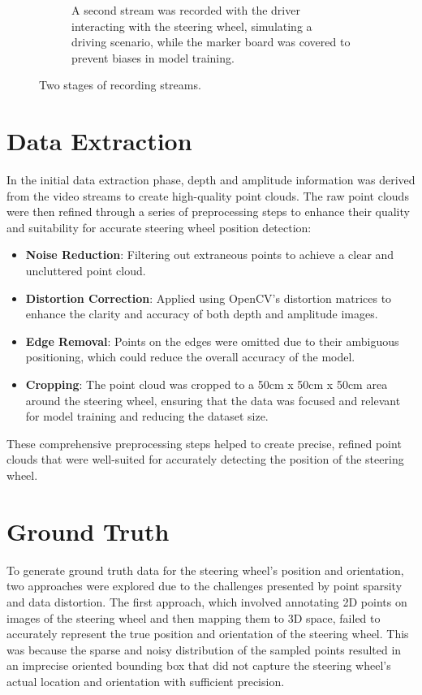 \begin{figure}[ht]
\begin{subfigure}[t]{0.45\textwidth}
        \caption{A second stream was recorded with the driver 
        interacting with the steering wheel, simulating a 
        driving scenario, while the marker board was covered 
        to prevent biases in model training.}
        \label{fig:main_stream}
    \end{subfigure}
    \caption{Two stages of recording streams.}
\end{figure}

\section{Data Extraction}
In the initial data extraction phase, depth and amplitude 
information was derived from the video streams to create 
high-quality point clouds. The raw point clouds were then refined 
through a series of preprocessing steps to enhance their quality 
and suitability for accurate steering wheel position detection:

\begin{itemize}
    \item \textbf{Noise Reduction}: Filtering out extraneous points to 
    achieve a clear and uncluttered point cloud.
    \item \textbf{Distortion Correction}: Applied using 
    OpenCV's distortion matrices to enhance the clarity and accuracy 
    of both depth and amplitude images.
    \item \textbf{Edge Removal}: Points on the edges  
    were omitted due to their ambiguous positioning, which could 
    reduce the overall accuracy of the model.
    \item \textbf{Cropping}: The point cloud was cropped to a 
    50cm x 50cm x 50cm area around the steering wheel, ensuring that 
    the data was focused and relevant for model training and reducing 
    the dataset size.
\end{itemize}

These comprehensive preprocessing steps helped to create precise, 
refined point clouds that were well-suited for accurately detecting 
the position of the steering wheel.


\section{Ground Truth}
To generate ground truth data for the steering wheel's position and 
orientation, two approaches were explored due to the challenges presented by point sparsity and data distortion. The first approach, which involved annotating 2D points on images of the steering wheel and then mapping them to 3D space, failed to accurately represent the true position and orientation of the steering wheel. This was because the sparse and noisy distribution of the sampled points resulted in an imprecise oriented bounding box that did not capture the steering wheel's actual location and orientation with sufficient precision. 

